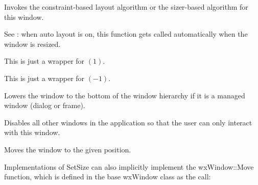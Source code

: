 
Invokes the constraint-based layout algorithm or the sizer-based algorithm
for this window.

See : when auto
layout is on, this function gets called automatically when the window is resized.


\label{wxwindowlinedown}

This is just a wrapper for $(1)$.


\label{wxwindowlineup}

This is just a wrapper for $(-1)$.


\label{wxwindowlower}


Lowers the window to the bottom of the window hierarchy if it is a managed window (dialog
or frame).


\label{wxwindowmakemodal}


Disables all other windows in the application so that
the user can only interact with this window.




\label{wxwindowmove}



Moves the window to the given position.






Implementations of SetSize can also implicitly implement the
wxWindow::Move function, which is defined in the base wxWindow class
as the call:

